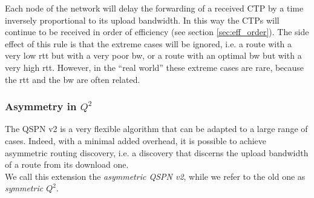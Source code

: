 \documentclass[a4paper]{article}
\begin{document}
Each node of the network will delay the forwarding of a received CTP by a time
inversely proportional to its upload bandwidth. In this way the CTPs will
continue to be received in order of efficiency (see section
\ref{sec:eff_order}).
The side effect of this rule is that the extreme cases will be ignored, i.e. a
route with a very low rtt but with a very poor bw, or a route with an optimal
bw but with a very high rtt. However, in the ``real world'' these extreme
cases are rare, because the rtt and the bw are often related.

\subsubsection{Asymmetry in $Q^2$}
The QSPN v2 is a very flexible algorithm that can be adapted to a large range
of cases. Indeed, with a minimal added overhead, it is possible to achieve
asymmetric routing discovery, i.e. a discovery that discerns the upload
bandwidth of a route from its download one.\\
We call this extension the \emph{asymmetric QSPN v2}, while we refer to the
old one as \emph{symmetric $Q^2$}.
\end{document}
